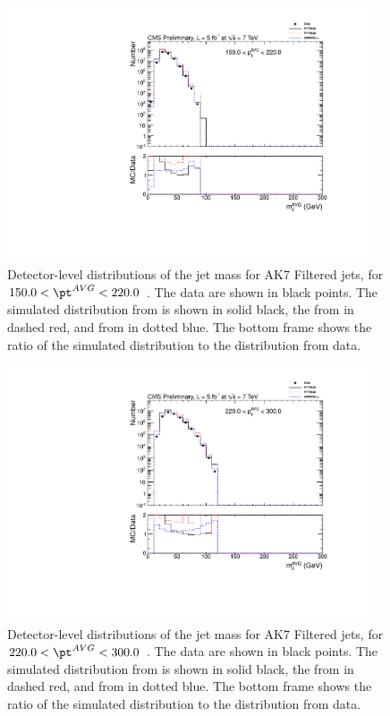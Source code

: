 \begin{figure}[htbp]
\centering
\includegraphics[width=0.95\textwidth]{figs/histAK7MjetVsPtAvg_rawDataMCComparisons_pt_3_Filtered}
\caption{Detector-level distributions of the jet mass for AK7 Filtered jets,
for $150.0 < \pt^{AVG} < 220.0$ \GeVc. The data are shown in black points.
The simulated distribution from \PYTHIA is shown in solid black, 
the from \PYTHIAEIGHT in dashed red, and from \HERWIG in dotted blue. 
The bottom frame shows the ratio of the simulated distribution
to the distribution from data. 
\label{figs:histAK7MjetVsPtAvg_rawDataMCComparisons_pt_3_Filtered}}
\end{figure}



\begin{figure}[htbp]
\centering
\includegraphics[width=0.95\textwidth]{figs/histAK7MjetVsPtAvg_rawDataMCComparisons_pt_4_Filtered}
\caption{Detector-level distributions of the jet mass for AK7 Filtered jets,
for $220.0 < \pt^{AVG} < 300.0$ \GeVc. The data are shown in black points.
The simulated distribution from \PYTHIA is shown in solid black, 
the from \PYTHIAEIGHT in dashed red, and from \HERWIG in dotted blue. 
The bottom frame shows the ratio of the simulated distribution
to the distribution from data. 
\label{figs:histAK7MjetVsPtAvg_rawDataMCComparisons_pt_4_Filtered}}
\end{figure}



